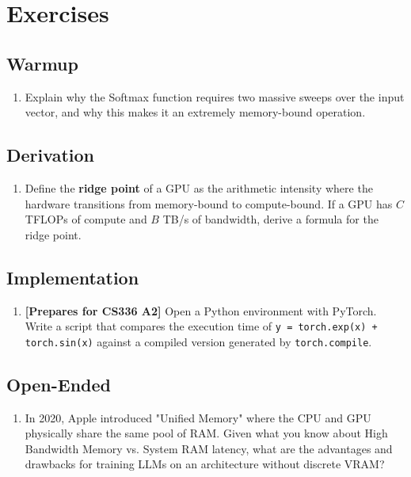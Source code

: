 \section{Exercises}
\label{ch:04:sec:exercises}

\subsection*{Warmup}
\begin{enumerate}
  \item Explain why the Softmax function requires two massive sweeps over the input vector, and why this makes it an extremely memory-bound operation.
\end{enumerate}

\subsection*{Derivation}
\begin{enumerate}
  \item Define the \textbf{ridge point} of a GPU as the arithmetic intensity where the hardware transitions from memory-bound to compute-bound. If a GPU has $C$ TFLOPs of compute and $B$ TB/s of bandwidth, derive a formula for the ridge point.
\end{enumerate}

\subsection*{Implementation}
\begin{enumerate}
  \item \textbf{[Prepares for CS336 A2]} Open a Python environment with PyTorch. Write a script that compares the execution time of \texttt{y = torch.exp(x) + torch.sin(x)} against a compiled version generated by \texttt{torch.compile}.
\end{enumerate}

\subsection*{Open-Ended}
\begin{enumerate}
  \item In 2020, Apple introduced "Unified Memory" where the CPU and GPU physically share the same pool of RAM. Given what you know about High Bandwidth Memory vs. System RAM latency, what are the advantages and drawbacks for training LLMs on an architecture without discrete VRAM?
\end{enumerate}

